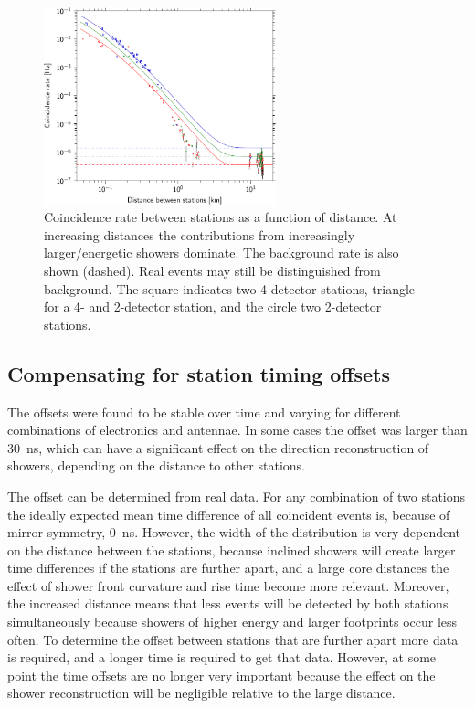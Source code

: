 \begin{figure}
    \centering
    \includegraphics[width=0.6\textwidth]
                    {plots/cluster/distance_v_coincidence_rate}
    \caption{Coincidence rate between stations as a function of distance. At increasing distances the contributions from increasingly larger/energetic showers dominate. The background rate is also shown (dashed). Real events may still be distinguished from background. The square indicates two 4-detector stations, triangle for a 4- and 2-detector station, and the circle two 2-detector stations.}
    \label{fig:distance_v_coincidence_rate}
\end{figure}


\subsection{Compensating for station timing offsets}

The offsets were found to be stable over time and varying for different combinations of \hisparc electronics and \gps antennae. In some cases the offset was larger than \SI{30}{\ns}, which can have a significant effect on the direction reconstruction of showers, depending on the distance to other stations.

The offset can be determined from real data. For any combination of two stations the ideally expected mean time difference of all coincident events is, because of mirror symmetry, \SI{0}{\ns}. However, the width of the distribution is very dependent on the distance between the stations, because inclined showers will create larger time differences if the stations are further apart, and a large core distances the effect of shower front curvature and rise time become more relevant. Moreover, the increased distance means that less events will be detected by both stations simultaneously because showers of higher energy and larger footprints occur less often. To determine the offset between stations that are further apart more data is required, and a longer time is required to get that data. However, at some point the time offsets are no longer very important because the effect on the shower reconstruction will be negligible relative to the large distance.


